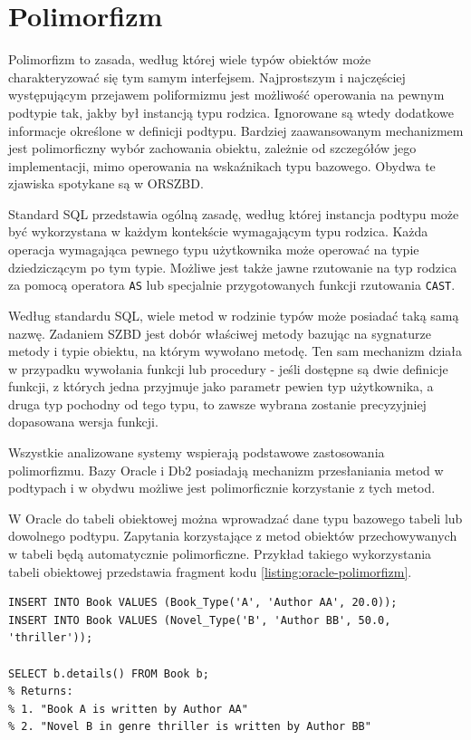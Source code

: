 \documentclass[a4paper,twoside,12pt]{book}
\begin{document}
\section{Polimorfizm}

Polimorfizm to zasada, według której wiele typów obiektów może charakteryzować się tym samym interfejsem. Najprostszym i najczęściej występującym przejawem poliformizmu jest możliwość operowania na pewnym podtypie tak, jakby był instancją typu rodzica. Ignorowane są wtedy dodatkowe informacje określone w definicji podtypu. Bardziej zaawansowanym mechanizmem jest polimorficzny wybór zachowania obiektu, zależnie od szczegółów jego implementacji, mimo operowania na wskaźnikach typu bazowego. Obydwa te zjawiska spotykane są w ORSZBD.

Standard SQL przedstawia ogólną zasadę, według której instancja podtypu może być wykorzystana w każdym kontekście wymagającym typu rodzica. Każda operacja wymagająca pewnego typu użytkownika może operować na typie dziedziczącym po tym typie. Możliwe jest także jawne rzutowanie na typ rodzica za pomocą operatora \lstinline{AS} lub specjalnie przygotowanych funkcji rzutowania \lstinline{CAST}.

Według standardu SQL, wiele metod w rodzinie typów może posiadać taką samą nazwę. Zadaniem SZBD jest dobór właściwej metody bazując na sygnaturze metody i typie obiektu, na którym wywołano metodę. Ten sam mechanizm działa w przypadku wywołania funkcji lub procedury - jeśli dostępne są dwie definicje funkcji, z których jedna przyjmuje jako parametr pewien typ użytkownika, a druga typ pochodny od tego typu, to zawsze wybrana zostanie precyzyjniej dopasowana wersja funkcji.

Wszystkie analizowane systemy wspierają podstawowe zastosowania polimorfizmu. Bazy Oracle i Db2 posiadają mechanizm przesłaniania metod w podtypach i w obydwu możliwe jest polimorficznie korzystanie z tych metod.

W Oracle do tabeli obiektowej można wprowadzać dane typu bazowego tabeli lub dowolnego podtypu. Zapytania korzystające z metod obiektów przechowywanych w tabeli będą automatycznie polimorficzne. Przykład takiego wykorzystania tabeli obiektowej przedstawia fragment kodu \ref{listing:oracle-polimorfizm}.

\begin{lstlisting}[style=SQL, caption={Przykład polimorfizmu w Oracle Database.}, label={listing:oracle-polimorfizm}, captionpos=b]
INSERT INTO Book VALUES (Book_Type('A', 'Author AA', 20.0));
INSERT INTO Book VALUES (Novel_Type('B', 'Author BB', 50.0, 'thriller'));

SELECT b.details() FROM Book b;
% Returns:
% 1. "Book A is written by Author AA"
% 2. "Novel B in genre thriller is written by Author BB"  
\end{lstlisting}
\end{document}
